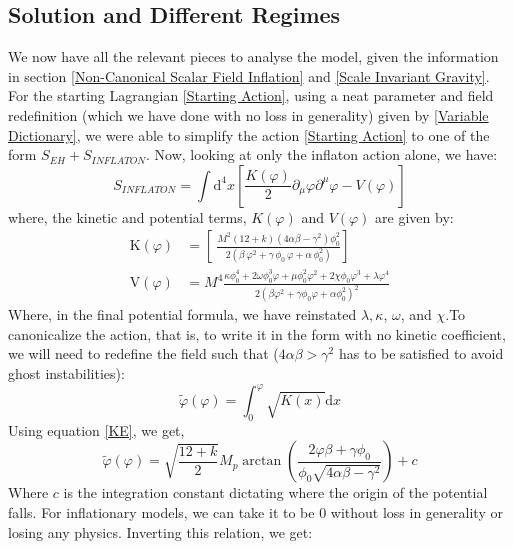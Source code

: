 \documentclass[aps,prd,reprint,preprintnumbers,showpacs,floatfix,nofootinbib,superscript address]{revtex4-2}
\begin{document}
\subsection{Solution and Different Regimes} \label{Solution}
We now have all the relevant pieces to analyse the model, given the information in section \ref{Non-Canonical Scalar Field Inflation}  and \ref{Scale Invariant Gravity}. For the starting Lagrangian \ref{Starting Action}, using a neat parameter and field redefinition (which we have done with no loss in generality) given by \ref{Variable Dictionary}, we were able to simplify the action \ref{Starting Action} to one of the form $S_{EH} + S_{INFLATON}$. Now, looking at only the inflaton action alone, we have: 
\begin{equation}
    S_{INFLATON} = \int \text{d}^4x \left[ \frac{K(\varphi)}{2} \partial_\mu \varphi \partial^\mu \varphi - V(\varphi)\right]
\end{equation}
where, the kinetic and potential terms, $K(\varphi)$ and $V(\varphi)$ are given by:
\begin{align}
    \text{K}(\varphi) &= \left[\ \frac{M^2(12+k)(4\alpha\beta-\gamma^2) \phi_0^2}{2(\beta\,\varphi^2 + \gamma\,\phi_0\,\varphi + \alpha\,\phi_0^2)} \right] \label{KE} \\
    \text{V}(\varphi) &= M^4  \frac{ \kappa \phi_0^4 + 2\omega \phi_0^3 \varphi +\mu \phi^2_0 \varphi^2 + 2\chi \phi_0 \varphi^3 + \lambda \varphi^4 }{2(\beta \varphi^2 + \gamma\phi_0\varphi + \alpha \phi_0^2)^2} \label{VE}
\end{align}
Where, in the final potential formula, we have reinstated $\lambda, \kappa$, $\omega$, and $\chi$.To canonicalize the action, that is, to write it in the form with no kinetic coefficient, we will need to redefine the field such that ($4\alpha \beta > \gamma^2$ has to be satisfied to avoid ghost instabilities):
\begin{equation} \label{40}
    \tilde{\varphi}(\varphi) = \int_0^{\varphi} \sqrt{K(x)} \text{d}x
\end{equation}
Using equation \ref{KE}, we get,
\begin{equation}
    \tilde{\varphi}(\varphi) = \sqrt{\frac{12+k}{2}}M_p \arctan \left( \frac{2\varphi\beta + \gamma \phi_0}{\phi_0\sqrt{4\alpha\beta - \gamma^2}} \right) + c
\end{equation}
Where $c$ is the integration constant dictating where the origin of the potential falls. For inflationary models, we can take it to be 0 without loss in generality or losing any physics. Inverting this relation, we get:
\end{document}
